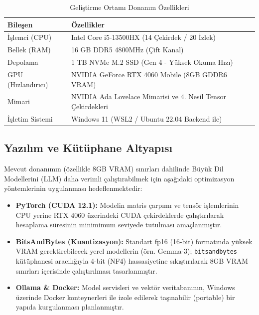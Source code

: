 \documentclass[12pt,a4paper]{report}
\begin{document}
\begin{table}[H]
  \centering
  \caption{Geliştirme Ortamı Donanım Özellikleri}
  \begin{tabular}{|l|l|}
    \hline
    \textbf{Bileşen} & \textbf{Özellikler} \\
    \hline
    İşlemci (CPU) & Intel Core i5-13500HX (14 Çekirdek / 20 İzlek) \\
    \hline
    Bellek (RAM) & 16 GB DDR5 4800MHz (Çift Kanal) \\
    \hline
    Depolama & 1 TB NVMe M.2 SSD (Gen 4 - Yüksek Okuma Hızı) \\
    \hline
    GPU (Hızlandırıcı) & NVIDIA GeForce RTX 4060 Mobile (8GB GDDR6 VRAM) \\
    \hline
    Mimari & NVIDIA Ada Lovelace Mimarisi ve 4. Nesil Tensor Çekirdekleri \\
    \hline
    İşletim Sistemi & Windows 11 (WSL2 / Ubuntu 22.04 Backend ile) \\
    \hline
  \end{tabular}
  \label{tab:donanim}
\end{table}

\newpage

\subsection{Yazılım ve Kütüphane Altyapısı}
Mevcut donanımın (özellikle 8GB VRAM) sınırları dahilinde Büyük Dil Modellerini (LLM) daha verimli çalıştırabilmek için aşağıdaki optimizasyon yöntemlerinin uygulanması hedeflenmektedir:

\begin{itemize}
    \item \textbf{PyTorch (CUDA 12.1):} Modelin matris çarpımı ve tensör işlemlerinin CPU yerine RTX 4060 üzerindeki CUDA çekirdeklerde çalıştırılarak hesaplama süresinin minimimum seviyede tutulması amaçlanmıştır.
    \item \textbf{BitsAndBytes (Kuantizasyon):} Standart fp16 (16-bit) formatında yüksek VRAM gerektirebilecek yerel modellerin (örn. Gemma-3); \texttt{bitsandbytes} kütüphanesi aracılığıyla 4-bit (NF4) hassasiyetine sıkıştırılarak 8GB VRAM sınırları içerisinde çalıştırılması tasarlanmıştır.
    \item \textbf{Ollama \& Docker:} Model servisleri ve vektör veritabanının, Windows üzerinde Docker konteynerleri ile izole edilerek taşınabilir (portable) bir yapıda kurgulanması planlanmıştır.
\end{itemize}
\end{document}
